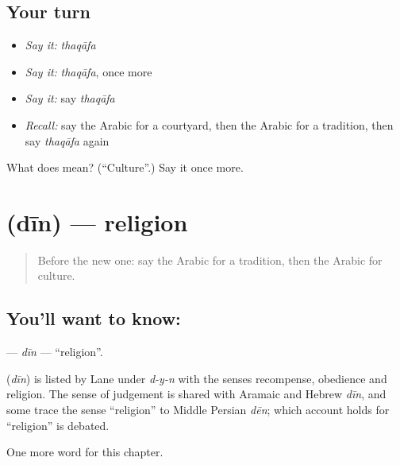\subsection*{Your turn}
\begin{itemize}
\raggedright
  \item \emph{Say it:} \emph{thaqāfa}
  \item \emph{Say it:} \emph{thaqāfa}, once more
  \item \emph{Say it:} say \emph{thaqāfa}
  \item \emph{Recall:} say the Arabic for a courtyard, then the Arabic for a tradition, then say \emph{thaqāfa} again
\end{itemize}

\begin{tcolorbox}[breakable,colback=teal!4,colframe=teal!35!black,title={Before you move on}]
What does  mean? (\textquotedblleft{}Culture\textquotedblright{}.) Say it once more.
\end{tcolorbox}
\section[\texorpdfstring{\ar{دين} (dīn)}{دين (dīn)}]{ (dīn) — religion}

\label{lesson:AR-C267-din}



\begin{quote}
Before the new one: say the Arabic for a tradition, then the Arabic for culture.
\end{quote}

\subsection*{You'll want to know: }
\textbf{} — \emph{dīn} — \textquotedblleft{}religion\textquotedblright{}.

\begin{cousinweb}
\textbf{} (\emph{dīn}) is listed by Lane under \emph{d-y-n} with the senses recompense, obedience and religion. The sense of judgement is shared with Aramaic and Hebrew \emph{dīn}, and some trace the sense \textquotedblleft{}religion\textquotedblright{} to Middle Persian \emph{dēn}; which account holds for \textquotedblleft{}religion\textquotedblright{} is debated.
\end{cousinweb}

\begin{grammarlens}[title={What you've built}]
One more word for this chapter.
\end{grammarlens}

